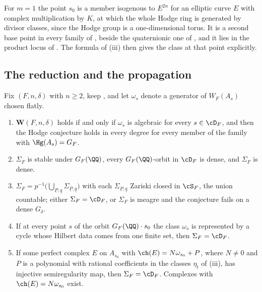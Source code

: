 \begin{remark}\label{rem:cmquadratic}
For $m=1$ the point $s_{0}$ is a member isogenous to $E^{2n}$ for an elliptic
curve $E$ with complex multiplication by $K$, at which the whole Hodge ring
is generated by divisor classes, since the Hodge group is a one-dimensional
torus. It is a second base point in every family of ,
beside the quaternionic one of , and it lies in the
product locus of . The formula of
(iii) then gives the class at that point explicitly.
\end{remark}

\subsection{The reduction and the propagation}\label{ssec:cmpropagation}

\begin{theorem}
\label{thm:cmpropagation}
Fix $(F,n,\delta)$ with $n\ge2$, keep , and let
$\omega_{s}$ denote a generator of $W_{F}(A_{s})$ chosen flatly.
\begin{enumerate}[label=\textup{(\roman*)},leftmargin=2.6em,itemsep=2pt]
\item $\mathbf{W}(F,n,\delta)$ holds if and only if $\omega_{s}$ is algebraic
  for every $s\in\cD_{F}$, and then the Hodge conjecture holds in every
  degree for every member of the family with $\Hg(A_{s})=G_{F}$.
\item $\Sigma_{F}$ is stable under $G_{F}(\QQ)$, every $G_{F}(\QQ)$-orbit in
  $\cD_{F}$ is dense, and $\Sigma_{F}$ is dense.
\item $\Sigma_{F}=p^{-1}\bigl(\bigcup_{\underline{P},\underline{q}}
  \Sigma_{\underline{P},\underline{q}}\bigr)$ with each
  $\Sigma_{\underline{P},\underline{q}}$ Zariski closed in $\cS_{F}$, the
  union countable; either $\Sigma_{F}=\cD_{F}$, or $\Sigma_{F}$ is meagre and
  the conjecture fails on a dense $G_{\delta}$.
\item If at every point $s$ of the orbit $G_{F}(\QQ)\cdot s_{0}$ the class
  $\omega_{s}$ is represented by a cycle whose Hilbert data comes from one
  finite set, then $\Sigma_{F}=\cD_{F}$.
\item If some perfect complex $E$ on $A_{s_{0}}$ with
  $\ch(E)=N\omega_{s_{0}}+P$, where $N\ne0$ and $P$ is a polynomial with
  rational coefficients in the classes $\eta_{t}$ of
  (iii), has injective semiregularity map, then
  $\Sigma_{F}=\cD_{F}$. Complexes with $\ch(E)=N\omega_{s_{0}}$ exist.
\end{enumerate}
\end{theorem}

